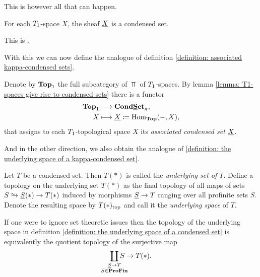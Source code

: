 This is however all that can happen.
\begin{lemma}
	\label{lemma: T1-spaces give rise to condensed sets}
	
	For each ${T_1}$-space $X$, the sheaf $\underline{X}$ is a condensed set.
\end{lemma}
\begin{shortproof}
	This is \cite[Prop. 2.15]{condenseddotpdf}.
\end{shortproof}

With this we can now define the analogue of definition \ref{definition: associated kappa-condensed sets}.
\begin{definition}
	Denote by ${{{\mathbf{Top}}}_1}$ the full subcategory of $\Top$ of ${T_1}$-spaces. By lemma \ref{lemma: T1-spaces give rise to condensed sets} there is a functor
	\begin{align*}
		{{{\mathbf{Top}}}_1} &\longrightarrow {{{\mathbf{Cond}}}{{\mathbf{\underline{S}et}}}_{\kappa}},\\
		X&\longmapsto \underline{X}\coloneqq {\operatorname{Hom}}_{{\mathbf{Top}}}(-, X),
	\end{align*}
	that assigns to each ${T_1}$-topological space $X$ its \emph{associated condensed set} $\underline{X}$.
\end{definition}

And in the other direction, we also obtain the analogue of \ref{definition: the underlying space of a kappa-condensed set}.
\begin{definition}
	\label{definition: the underlying space of a condensed set}
	
	Let $T$ be a condensed set. Then $T(\ast)$ is called the \emph{underlying set of $T$}. Define a topology on the underlying set $T(\ast)$ as the final topology of all maps of sets $S\shortisorightarrow \associated{S}(\ast)\to T(\ast)$ induced by morphisms $\underline{S}\to T$ ranging over all profinite sets $S$. Denote the resulting space by ${T(\ast)_\mathrm{top}}$ and call it the \emph{underlying space} of $T$.
\end{definition}

\begin{remark}
	If one were to ignore set theoretic issues then the topology of the underlying space in definition \ref{definition: the underlying space of a condensed set} is equivalently the quotient topology of the surjective map
		$$\smashoperator{\coprod_{\substack{\associated{S}\to T\\S\in\proFiniteSets}}} S\to T(\ast).$$
\end{remark}

